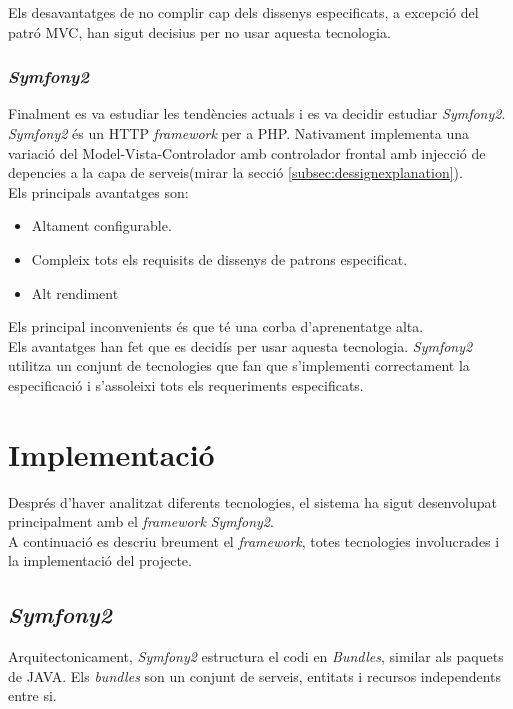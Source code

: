 Els desavantatges de no complir cap dels dissenys especificats, a excepció del patró MVC, han sigut decisius per no usar aquesta tecnologia.

\subsubsection{\textit{Symfony2}}
Finalment es va estudiar les tendències actuals i es va decidir estudiar \textit{Symfony2}.\cite{symfony} \textit{Symfony2} \'{e}s un HTTP \textit{framework} per a PHP. Nativament implementa una variaci\'{o} del Model-Vista-Controlador amb controlador frontal amb injecci\'{o} de depencies a la capa de serveis(mirar la secció \ref{subsec:dessignexplanation}).\\

Els principals avantatges son:
\begin{itemize}
\item Altament configurable.
\item Compleix tots els requisits de dissenys de patrons especificat.
\item Alt rendiment
\end{itemize}

Els principal inconvenients \'{e}s que t\'{e} una corba d'aprenentatge alta.\\

Els avantatges han fet que es decidís per usar aquesta tecnologia. \textit{Symfony2} utilitza un conjunt de tecnologies que fan que s'implementi correctament la especificació i s'assoleixi tots els requeriments especificats.\\

\section{Implementaci\'{o}}
Després d'haver analitzat diferents tecnologies, el sistema ha sigut desenvolupat principalment amb el \textit{framework} \textit{Symfony2}.\\

A continuació es descriu breument el \textit{framework}, totes tecnologies involucrades i la implementació del projecte.

\subsection{\textit{Symfony2}}
Arquitectonicament, \textit{Symfony2} estructura el codi en \textit{Bundles}, similar als paquets de JAVA. Els \textit{bundles} son un conjunt de serveis, entitats i recursos independents entre si.\\

